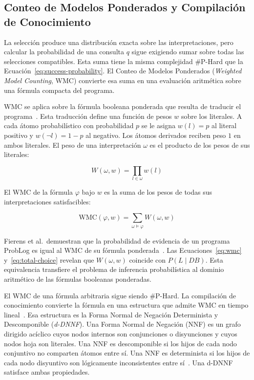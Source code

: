 \subsection{Conteo de Modelos Ponderados y Compilación de Conocimiento}
\label{sec:mt-wmc}

La selección produce una distribución exacta sobre las interpretaciones, pero calcular la probabilidad de una consulta $q$ sigue exigiendo sumar sobre todas las selecciones compatibles. Esta suma tiene la misma complejidad \#P-Hard que la Ecuación~\ref{eq:success-probability}. El Conteo de Modelos Ponderados (\textit{Weighted Model Counting}, WMC) convierte esa suma en una evaluación aritmética sobre una fórmula compacta del programa.

WMC se aplica sobre la fórmula booleana ponderada que resulta de traducir el programa~\cite{fierens2015inference}. Esta traducción define una función de pesos $w$ sobre los literales. A cada átomo probabilístico con probabilidad $p$ se le asigna $w(l) = p$ al literal positivo y $w(\neg l) = 1 - p$ al negativo. Los átomos derivados reciben peso $1$ en ambos literales. El peso de una interpretación $\omega$ es el producto de los pesos de sus literales:

\begin{equation}
  W(\omega, w) = \prod_{l \in \omega} w(l)
  \label{eq:model-weight}
\end{equation}

El WMC de la fórmula $\varphi$ bajo $w$ es la suma de los pesos de todas sus interpretaciones satisfacibles:

\begin{equation}
  \text{WMC}(\varphi, w) = \sum_{\omega \models \varphi} W(\omega, w)
  \label{eq:wmc}
\end{equation}

Fierens et al.\ demuestran que la probabilidad de evidencia de un programa ProbLog es igual al WMC de su fórmula ponderada~\cite{fierens2015inference}. Las Ecuaciones~\ref{eq:wmc} y~\ref{eq:total-choice} revelan que $W(\omega, w)$ coincide con $P(L \mid DB)$. Esta equivalencia transfiere el problema de inferencia probabilística al dominio aritmético de las fórmulas booleanas ponderadas.

El WMC de una fórmula arbitraria sigue siendo \#P-Hard. La compilación de conocimiento convierte la fórmula en una estructura que admite WMC en tiempo lineal~\cite{darwiche2002knowledge}. Esa estructura es la Forma Normal de Negación Determinista y Descomponible (\textit{d-DNNF}). Una Forma Normal de Negación (NNF) es un grafo dirigido acíclico cuyos nodos internos son conjunciones o disyunciones y cuyos nodos hoja son literales. Una NNF es descomponible si los hijos de cada nodo conjuntivo no comparten átomos entre sí. Una NNF es determinista si los hijos de cada nodo disyuntivo son lógicamente inconsistentes entre sí~\cite{darwiche2002knowledge}. Una d-DNNF satisface ambas propiedades.

